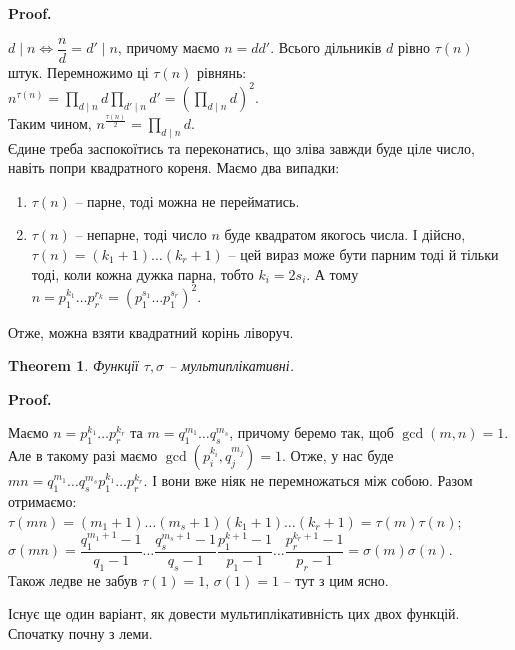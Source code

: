 \documentclass[a4paper, 10pt]{article}
\makeatletter
\theoremstyle{theoremdd}
\newtheorem{theorem}{Theorem}[subsection]
\theoremstyle{theoremdd}
\theoremstyle{theoremdd}
\theoremstyle{theoremdd}
\theoremstyle{theoremdd}
\theoremstyle{theoremdd}
\theoremstyle{theoremdd}
\theoremstyle{theoremdd}
\renewenvironment{proof}[1][Proof.\\]{\par
\pushQED{\hfill \qed}%
\normalfont \topsep6\p@\@plus6\p@\relax
\trivlist
\item\relax
{\bfseries
#1\@addpunct{.}}\hspace\labelsep\ignorespaces
}{%
\popQED\endtrivlist\@endpefalse
}
\makeatother
\begin{document}
\begin{proof}
$d \mid n \iff \dfrac{n}{d} = d' \mid n$, причому маємо $n = dd'$. Всього дільників $d$ рівно $\tau(n)$ штук. Перемножимо ці $\tau(n)$ рівнянь:\\
$n^{\tau(n)} = \displaystyle\prod_{d \mid n} d \displaystyle\prod_{d' \mid n} d' = \left( \displaystyle\prod_{d \mid n} d \right)^2$.\\
Таким чином, $n^{\frac{\tau(n)}{2}} = \displaystyle\prod_{d \mid n} d$.
\bigskip \\
Єдине треба заспокоїтись та переконатись, що зліва завжди буде ціле число, навіть попри квадратного кореня. Маємо два випадки:
\begin{enumerate}[nosep,wide=0pt,label={\arabic*)}]
\item $\tau(n)$ -- парне, тоді можна не перейматись.
\item $\tau(n)$ -- непарне, тоді число $n$ буде квадратом якогось числа. І дійсно, $\tau(n) = (k_1+1) \dots (k_r+1)$ -- цей вираз може бути парним тоді й тільки тоді, коли кожна дужка парна, тобто $k_i = 2s_i$. А тому $n = p_1^{k_1} \dots p_r^{r_k} = (p_1^{s_1} \dots p_1^{s_r})^2$.
\end{enumerate} 
Отже, можна взяти квадратний корінь ліворуч.
\end{proof}

\begin{theorem}
Функції $\tau, \sigma$ -- мультиплікативні.
\end{theorem}

\begin{proof}
Маємо $n = p_1^{k_1} \dots p_r^{k_r}$ та $m = q_1^{m_1} \dots q_s^{m_s}$, причому беремо так, щоб $\gcd(m,n) = 1$. Але в такому разі маємо $\gcd\left(p_i^{k_i},q_j^{m_j}\right) = 1$. Отже, у нас буде $mn = q_1^{m_1} \dots q_s^{m_s} p_1^{k_1} \dots p_r^{k_r}$. І вони вже ніяк не перемножаться між собою. Разом отримаємо:\\
$\tau(mn) = (m_1+1) \dots (m_s+1) (k_1+1) \dots (k_r+1) = \tau(m) \tau(n)$;\\
$\sigma(mn) = \dfrac{q_1^{m_1+1}-1}{q_1-1} \dots \dfrac{q_s^{m_s+1}-1}{q_s-1} \dfrac{p_1^{k+1}-1}{p_1-1} \dots \dfrac{p_r^{k_r+1}-1}{p_r-1} = \sigma(m) \sigma(n)$.
\bigskip \\
Також ледве не забув $\tau(1) = 1$, $\sigma(1) = 1$ -- тут з цим ясно.
\end{proof}

Існує ще один варіант, як довести мультиплікативність цих двох функцій. Спочатку почну з леми.
\end{document}
